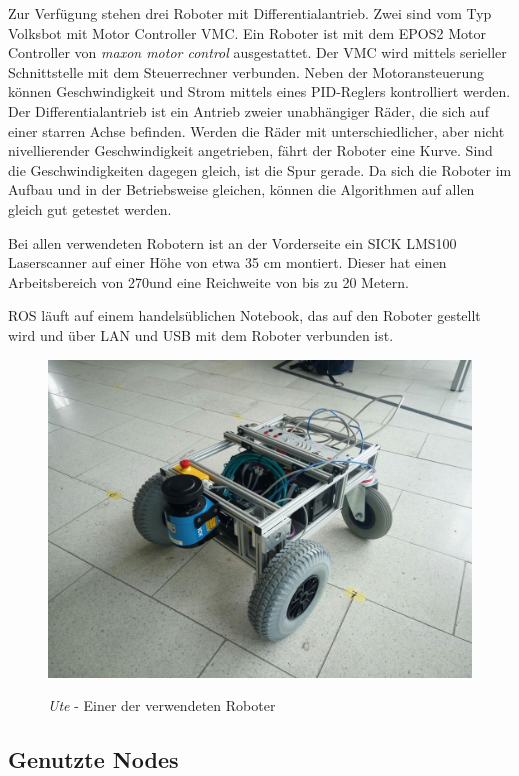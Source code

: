 \documentclass[11pt,a4paper]{article}
\begin{document}
{	Zur Verf\"ugung stehen drei Roboter mit Differentialantrieb. Zwei sind vom Typ Volksbot mit Motor Controller VMC. Ein Roboter ist mit dem EPOS2 Motor Controller von \textit{maxon motor control} ausgestattet. Der VMC \cite{Volksbot} wird mittels serieller Schnittstelle mit dem Steuerrechner verbunden. Neben der Motoransteuerung k\"onnen Geschwindigkeit und Strom mittels eines PID-Reglers kontrolliert werden. Der 
	Differentialantrieb ist ein Antrieb zweier unabh\"angiger R\"ader, die sich auf einer starren Achse befinden. Werden die R\"ader mit unterschiedlicher, aber nicht nivellierender Geschwindigkeit angetrieben, f\"ahrt der Roboter eine Kurve. Sind die Geschwindigkeiten dagegen gleich, ist die Spur gerade.
	Da sich die Roboter im Aufbau und in der Betriebsweise gleichen, k\"onnen die Algorithmen auf allen gleich gut getestet werden.

	Bei allen verwendeten Robotern ist an der Vorderseite ein SICK LMS100 Laserscanner auf einer H\"ohe von etwa 35 cm montiert. Dieser hat einen Arbeitsbereich von 270\degree  und eine Reichweite von bis zu 20 Metern.\cite{lms} 
 
	ROS l\"auft auf einem handels\"ublichen Notebook, das auf den Roboter gestellt wird und \"uber LAN und USB mit dem Roboter verbunden ist. 
 

\begin{figure}[h]
	\centering
	{\includegraphics[trim= 2cm 2cm 2cm 2cm, clip=true,width=\linewidth]{pictures/robot.jpg}}
	\caption{\textit{Ute} - Einer der verwendeten Roboter}
\end{figure}


\subsection{Genutzte Nodes}
{

}}
\end{document}
